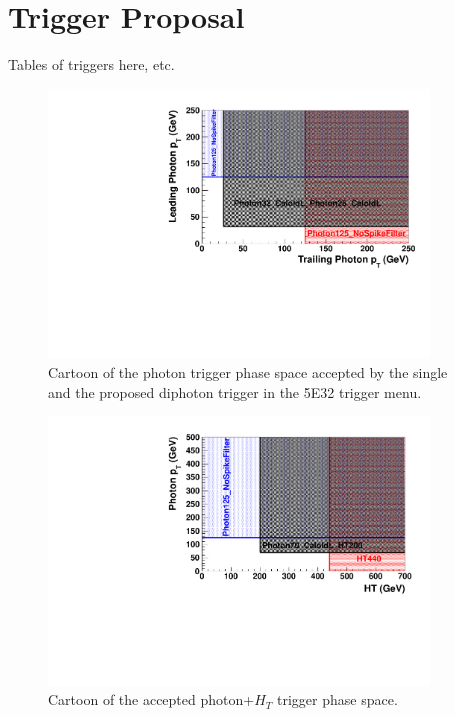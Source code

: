\section{Trigger Proposal}

Tables of triggers here, etc.


 \begin{figure}[!ht]
  \centering
 \includegraphics[width=0.90\textwidth]{figures/photonphotonphaseplot.pdf}
\caption{Cartoon of the photon trigger phase space accepted by the single and the proposed diphoton trigger in
the 5E32 trigger menu.}
\label{fig:photonphotonphase}
\end{figure}



 \begin{figure}[!ht]
  \centering
 \includegraphics[width=0.90\textwidth]{figures/photon_htphaseplot.pdf}

\caption{Cartoon of the accepted photon+$H_T$  trigger phase space. }
\label{fig:htphase}
\end{figure}

